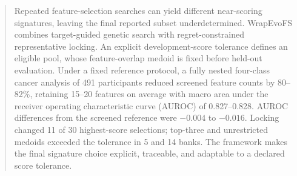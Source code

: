 \documentclass[10pt,letterpaper]{article}
\begin{document}
\WrapEvoFSTitlePage{}{}
\modulolinenumbers[1]
\linenumbers

\begin{abstract}
Repeated feature-selection searches can yield different near-scoring signatures, leaving the final reported subset underdetermined. WrapEvoFS combines target-guided genetic search with regret-constrained representative locking. An explicit development-score tolerance defines an eligible pool, whose feature-overlap medoid is fixed before held-out evaluation. Under a fixed reference protocol, a fully nested four-class cancer analysis of 491 participants reduced screened feature counts by 80--82\%, retaining 15--20 features on average with macro area under the receiver operating characteristic curve (AUROC) of 0.827--0.828. AUROC differences from the screened reference were $-0.004$ to $-0.016$. Locking changed 11 of 30 highest-score selections; top-three and unrestricted medoids exceeded the tolerance in 5 and 14 banks. The framework makes the final signature choice explicit, traceable, and adaptable to a declared score tolerance.
\end{abstract}



\FloatBarrier
\begingroup
\small
\setlength{\bibsep}{0pt plus 0.3ex}


\endgroup


\end{document}
